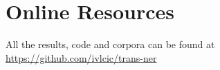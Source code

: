 \documentclass[sigconf]{acmart}
\begin{document}




\appendix

\section{Online Resources}

All the results, code and corpora can be found at \url{https://github.com/ivlcic/trans-ner}
\end{document}
